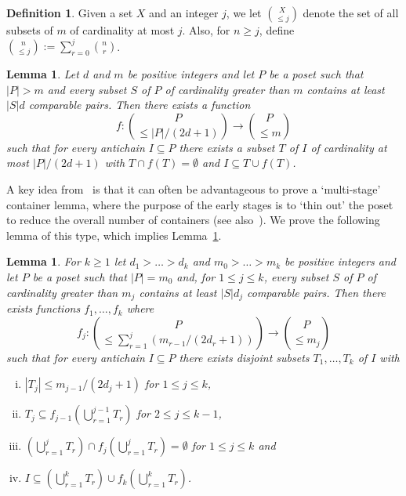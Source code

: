 \documentclass[11 pt]{article}
\newtheorem{lem}[equation]{Lemma}
\theoremstyle{definition}
\newtheorem{defn}[equation]{Definition}
\theoremstyle{case}
\numberwithin{equation}{section}
\begin{document}
\begin{defn}
Given a set $X$ and an integer $j$, we let $\binom{X}{\leq j}$ denote the set of all subsets of $m$ of cardinality at most $j$. Also, for $n\geq j$, define $\binom{n}{\leq j}:=\sum_{r=0}^j\binom{n}{r}$. 
\end{defn}

\begin{lem}
\label{generalCont}
Let $d$ and $m$ be positive integers and let $P$ be a poset such that $|P|> m$ and every subset $S$ of $P$ of cardinality greater than $m$ contains at least $|S|d$ comparable pairs. Then there exists a function
\[f:\binom{P}{\leq |P|/(2d+1)}\to\binom{P}{\leq m}\]
such that for every antichain $I\subseteq P$ there exists a subset $T$ of $I$ of cardinality at most $|P|/(2d+1)$ with $T\cap f(T)=\emptyset$ and $I\subseteq T\cup f(T)$. 
\end{lem}

A key idea from~\cite{RandomSperner} is that it can often be advantageous to prove a `multi-stage' container lemma, where the purpose of the early stages is to `thin out' the poset to reduce the overall number of containers (see also~\cite{BaloghWagnerBoolean}). We prove the following lemma of this type, which implies Lemma~\ref{generalCont}.

\begin{lem}
\label{generalContK}
For $k\geq1$ let $d_1> \dots> d_k$ and $m_0> \dots> m_k$ be positive integers and let $P$ be a poset such that $|P|=m_0$ and, for $1\leq j\leq k$, every subset $S$ of $P$ of cardinality greater than $m_j$ contains at least $|S|d_j$ comparable pairs. Then there exists functions $f_1,\dots,f_k$ where
\[f_j:\binom{P}{\leq \sum_{r=1}^j \left(m_{r-1}/(2d_r + 1)\right)}\to\binom{P}{\leq m_j}\]
such that for every antichain $I\subseteq P$ there exists disjoint subsets $T_1,\dots,T_k$ of $I$ with
\begin{enumerate}[(i)]
\item \label{CONTeachSSmall}$|T_{j}|\leq m_{j-1}/(2d_{j}+1)$ for $1\leq j\leq k$,
\item \label{CONTSinf}$T_{j}\subseteq f_{j-1}\left(\bigcup_{r=1}^{j-1}T_r\right)$ for $2\leq j\leq k-1$, 
\item \label{CONTdisjoint}$\left(\bigcup_{r=1}^j T_r\right)\cap f_j\left(\bigcup_{r=1}^j T_r\right)=\emptyset$ for $1\leq j\leq k$ and
\item\label{CONTcontainersContain} $I\subseteq \left(\bigcup_{r=1}^kT_r\right) \cup f_k\left(\bigcup_{r=1}^kT_r\right)$.
\end{enumerate}
\end{lem}
\end{document}
